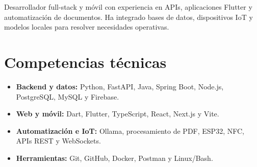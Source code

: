 \documentclass[11pt,a4paper,sans]{moderncv}
\begin{document}
\makecvtitle

\vspace{6pt}
\small{Desarrollador full-stack y móvil con experiencia en APIs, aplicaciones Flutter y automatización de documentos. Ha integrado bases de datos, dispositivos IoT y modelos locales para resolver necesidades operativas.}

\section{Competencias técnicas}
\begin{itemize}
  \item \textbf{Backend y datos:} Python, FastAPI, Java, Spring Boot, Node.js, PostgreSQL, MySQL y Firebase.
  \item \textbf{Web y móvil:} Dart, Flutter, TypeScript, React, Next.js y Vite.
  \item \textbf{Automatización e IoT:} Ollama, procesamiento de PDF, ESP32, NFC, APIs REST y WebSockets.
  \item \textbf{Herramientas:} Git, GitHub, Docker, Postman y Linux/Bash.
\end{itemize}
\end{document}
